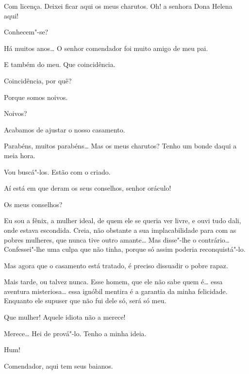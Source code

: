 {   Com licença. Deixei
ficar aqui os meus charutos.  Oh! a
senhora Dona Helena aqui!

  Conhecem"-se?

  Há muitos anos\ldots{} O senhor comendador foi
muito amigo de meu pai.

  E também do meu. Que coincidência.

  Coincidência, por quê?

  Porque somos noivos.

  Noivos?

  Acabamos de ajustar o nosso casamento. 

  Parabéns, muitos
parabéns\ldots{} Mas os meus charutos? Tenho um bonde daqui a meia hora.

  Vou buscá"-los. Estão com o criado.


  Aí está em que deram os seus conselhos,
senhor oráculo!

  Os meus conselhos?

  Eu sou a fênix, a mulher ideal, de quem ele se queria ver
livre, e ouvi tudo dali, onde estava escondida. Creia, não obstante a
sua implacabilidade para com as pobres mulheres, que nunca tive outro
amante\ldots{} Mas disse"-lhe o contrário\ldots{} Confessei"-lhe uma culpa que não
tinha, porque só assim poderia reconquistá"-lo.

  Mas agora que o casamento está tratado, é
preciso dissuadir o pobre rapaz.

  Mais tarde, ou talvez nunca. Esse homem, que
ele não sabe quem é\ldots{} essa aventura misteriosa\ldots{} essa ignóbil mentira
é a garantia da minha felicidade. Enquanto ele supuser que não fui dele
só, será só meu.

  Que mulher! Aquele idiota não a merece!

  Merece\ldots{} Hei de prová"-lo. Tenho a minha ideia.

  
Hum!

 
 Comendador, aqui tem seus baianos.

}

